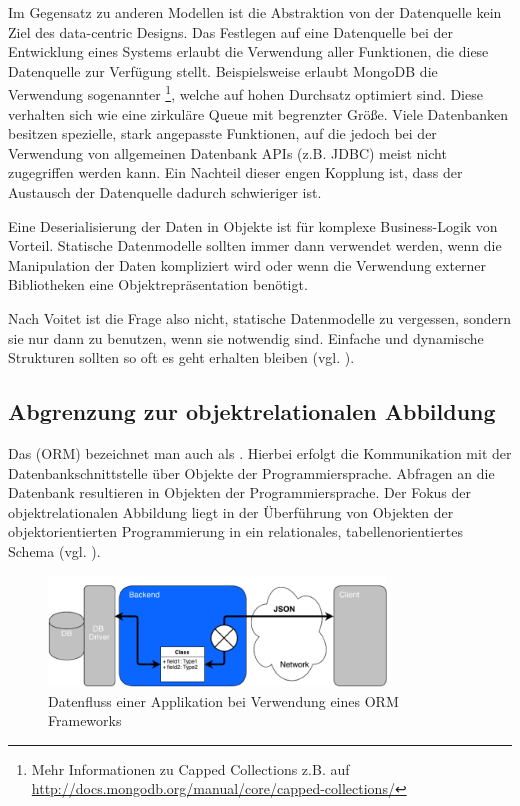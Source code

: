 Im Gegensatz zu anderen Modellen ist die Abstraktion von der Datenquelle kein Ziel des data-centric Designs. Das Festlegen auf eine Datenquelle bei der Entwicklung eines Systems erlaubt die Verwendung aller Funktionen, die diese Datenquelle zur Verfügung stellt. Beispielsweise erlaubt MongoDB die Verwendung sogenannter \footnote{Mehr Informationen zu Capped Collections z.B. auf \url{http://docs.mongodb.org/manual/core/capped-collections/}}, welche auf hohen Durchsatz optimiert sind. Diese verhalten sich wie eine zirkuläre Queue mit begrenzter Größe. Viele Datenbanken besitzen spezielle, stark angepasste Funktionen, auf die jedoch bei der Verwendung von allgemeinen Datenbank APIs (z.B. JDBC) meist nicht zugegriffen werden kann. Ein Nachteil dieser engen Kopplung ist, dass der Austausch der Datenquelle dadurch schwieriger ist. 

Eine Deserialisierung der Daten in Objekte ist für komplexe Business-Logik von Vorteil. Statische Datenmodelle sollten immer dann verwendet werden, wenn die Manipulation der Daten kompliziert wird oder wenn die Verwendung externer Bibliotheken eine Objektrepräsentation benötigt.  

Nach Voitet ist die Frage also nicht, statische Datenmodelle zu vergessen, sondern sie nur dann zu benutzen, wenn sie notwendig sind. Einfache und dynamische Strukturen sollten so oft es geht erhalten bleiben (vgl. \cite{jctc}).

\subsection{Abgrenzung zur objektrelationalen Abbildung}
Das  (ORM) bezeichnet man auch als . Hierbei erfolgt die Kommunikation mit der Datenbankschnittstelle über Objekte der Programmiersprache. Abfragen an die Datenbank resultieren in Objekten der Programmiersprache. Der Fokus der objektrelationalen Abbildung liegt in der Überführung von Objekten der objektorientierten Programmierung in ein relationales, tabellenorientiertes Schema (vgl. \cite{wambler}). 

\begin{figure}[h]   
  \centering     
  \includegraphics[width=0.8\textwidth]{img/orm.png}  
   \caption{Datenfluss einer Applikation bei Verwendung eines ORM Frameworks}   
  \label{fig:orm} 
\end{figure}

